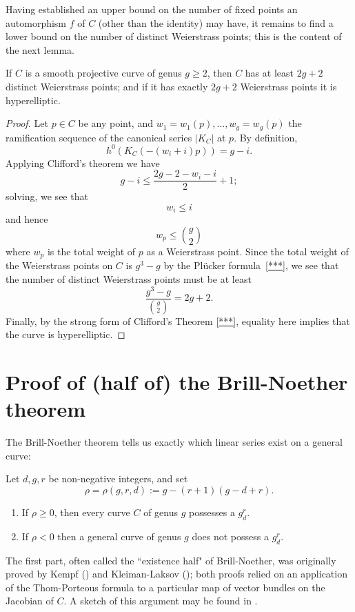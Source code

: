 Having established an upper  bound on the number of fixed points an automorphism $f$ of $C$ (other than the identity) may have, it remains to find a lower bound on the number of distinct Weierstrass points; this is the content of the next lemma.


\begin{lemma}
If $C$ is a smooth projective curve of genus $g \geq 2$, then $C$ has at least $2g+2$ distinct Weierstrass points; and if it has exactly $2g+2$ Weierstrass points it is hyperelliptic.
\end{lemma}

\begin{proof}
Let $p \in C$ be any point, and $w_1=w_1(p),\dots,w_g = w_g(p)$ the ramification sequence of the canonical series $|K_C|$ at $p$. By definition, 
$$
h^0(K_C(-(w_i+i)p)) = g - i.
$$
Applying Clifford's theorem we have
$$
g-i \leq \frac{2g - 2 - w_i - i}{2} + 1;
$$
solving, we see that
$$
w_i \leq i
$$
and hence
$$
w_p \leq \binom{g}{2}
$$
where $w_p$ is the total weight of $p$ as a Weierstrass point. Since the total weight of the Weierstrass points on $C$ is $g^3-g$ by the Pl\"ucker formula~\ref{***}, we see that the number of distinct Weierstrass points must be at least
$$
\frac{g^3-g}{\binom{g}{2}} = 2g+2.
$$
Finally, by the strong form of Clifford's Theorem \ref{***}, equality here implies that the curve is hyperelliptic.
\end{proof}

\section{Proof of (half of) the Brill-Noether theorem}

The Brill-Noether theorem tells us exactly which linear series exist on a general curve:

\begin{theorem} Let $d,g,r$ be non-negative integers, and set 
$$
\rho =\rho(g,r,d) := g - (r+1)(g-d+r).
$$
 \begin{enumerate}
\item If $\rho \geq 0$, then every curve $C$ of genus $g$ possesses a $g^r_d$.
\item If $\rho < 0$ then a general curve of genus $g$ does not possess a $g^r_d$.
\end{enumerate}
\end{theorem}

The first part, often called the ``existence half" of Brill-Noether, was originally proved by Kempf (\cite{}) and Kleiman-Laksov (\cite{}); both proofs relied on an application of the Thom-Porteous formula to a particular map of vector bundles on the Jacobian of $C$. A sketch of this argument may  be found in \cite[Appendix D.3]{3264}.  

